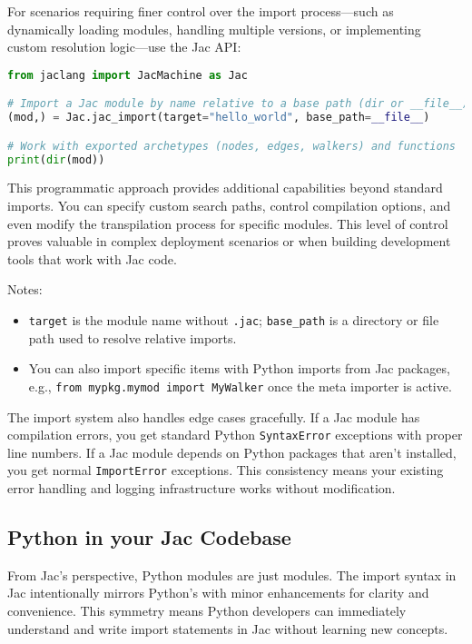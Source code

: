 For scenarios requiring finer control over the import process—such as dynamically loading modules, handling multiple versions, or implementing custom resolution logic—use the Jac API:

\begin{lstlisting}[language=Python]
from jaclang import JacMachine as Jac

# Import a Jac module by name relative to a base path (dir or __file__)
(mod,) = Jac.jac_import(target="hello_world", base_path=__file__)

# Work with exported archetypes (nodes, edges, walkers) and functions
print(dir(mod))
\end{lstlisting}

This programmatic approach provides additional capabilities beyond standard imports. You can specify custom search paths, control compilation options, and even modify the transpilation process for specific modules. This level of control proves valuable in complex deployment scenarios or when building development tools that work with Jac code.

Notes:
\begin{itemize}
    \item \texttt{target} is the module name without \texttt{.jac}; \texttt{base\_path} is a directory or file path used to resolve relative imports.
    \item You can also import specific items with Python imports from Jac packages, e.g., \texttt{from mypkg.mymod import MyWalker} once the meta importer is active.
\end{itemize}

The import system also handles edge cases gracefully. If a Jac module has compilation errors, you get standard Python \texttt{SyntaxError} exceptions with proper line numbers. If a Jac module depends on Python packages that aren't installed, you get normal \texttt{ImportError} exceptions. This consistency means your existing error handling and logging infrastructure works without modification.

\subsection{Python in your Jac Codebase}

From Jac's perspective, Python modules are just modules. The import syntax in Jac intentionally mirrors Python's with minor enhancements for clarity and convenience. This symmetry means Python developers can immediately understand and write import statements in Jac without learning new concepts.


